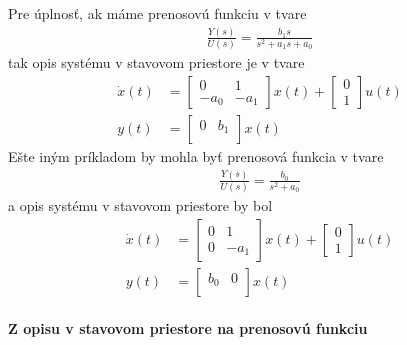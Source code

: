 \documentclass[a4paper, 10pt, ]{article}
\begin{document}
Pre úplnosť, ak máme prenosovú funkciu v tvare
\begin{align} 
	\frac{Y(s)}{U(s)} = \frac{b_1 s }{ s^2 + a_1 s + a_0}
\end{align}
tak opis systému v stavovom priestore je v tvare
\begin{subequations}
\begin{align}
    \dot x(t)
    &=
    \begin{bmatrix}
    	0 & 1 \\
    	- a_0 & - a_1
  	\end{bmatrix}
    x(t)
    +
    \begin{bmatrix}
    	  0 \\
          1
 	\end{bmatrix}
    u(t)
    \\
    y(t)
    &=
    \begin{bmatrix}
        0 & b_1 \\
    \end{bmatrix}
    x(t)
\end{align}
\end{subequations}
Ešte iným príkladom by mohla byť prenosová funkcia v tvare
\begin{align} 
	\frac{Y(s)}{U(s)} = \frac{b_0 }{ s^2 +  a_0}
\end{align}
a opis systému v stavovom priestore by bol
\begin{subequations}
    \begin{align}
        \dot x(t)
        &=
        \begin{bmatrix}
            0 & 1 \\
            0 & - a_1
          \end{bmatrix}
        x(t)
        +
        \begin{bmatrix}
              0 \\
              1
         \end{bmatrix}
        u(t)
        \\
        y(t)
        &=
        \begin{bmatrix}
            b_0 & 0 \\
        \end{bmatrix}
        x(t)
\end{align}
\end{subequations}






\paragraph{Z opisu v stavovom priestore na prenosovú funkciu}
\end{document}
